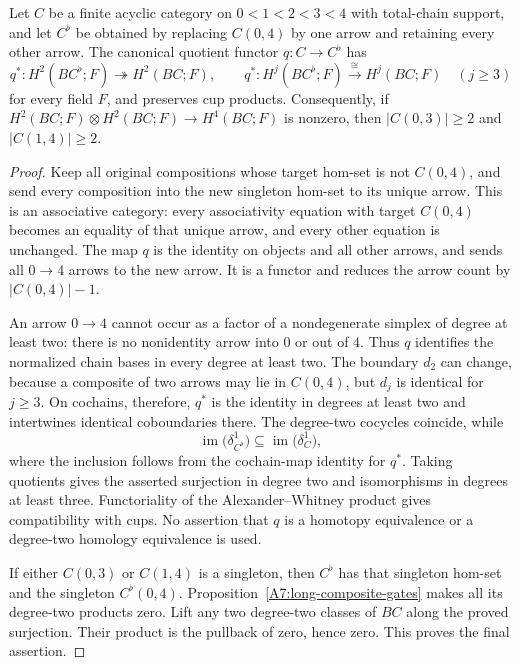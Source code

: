 \begin{proposition}
\label{A7:extreme-arrow-collapse}
Let $C$ be a finite acyclic category on $0<1<2<3<4$ with total-chain
support, and let $C^{\flat}$ be obtained by replacing $C(0,4)$ by
one arrow and retaining every other arrow. The canonical quotient
functor $q:C\to C^{\flat}$ has
\[
 q^*:H^2(BC^{\flat};F)\twoheadrightarrow H^2(BC;F),
 \qquad
 q^*:H^j(BC^{\flat};F)\xrightarrow{\cong}H^j(BC;F)
 \quad(j\geq3)
\]
for every field $F$, and preserves cup products. Consequently, if
$H^2(BC;F)\otimes H^2(BC;F)\to H^4(BC;F)$ is nonzero, then
$|C(0,3)|\geq2$ and $|C(1,4)|\geq2$.
\end{proposition}
\begin{proof}
Keep all original compositions whose target hom-set is not $C(0,4)$,
and send every composition into the new singleton hom-set to its
unique arrow. This is an associative category: every associativity
equation with target $C(0,4)$ becomes an equality of that unique
arrow, and every other equation is unchanged. The map $q$ is the
identity on objects and all other arrows, and sends all $0\to4$
arrows to the new arrow. It is a functor and reduces the arrow count
by $|C(0,4)|-1$.

An arrow $0\to4$ cannot occur as a factor of a nondegenerate
simplex of degree at least two: there is no nonidentity arrow into
$0$ or out of $4$. Thus $q$ identifies the normalized chain bases
in every degree at least two. The boundary $d_2$ can change,
because a composite of two arrows may lie in $C(0,4)$, but
$d_j$ is identical for $j\geq3$. On cochains, therefore, $q^*$
is the identity in degrees at least two and intertwines identical
coboundaries there. The degree-two cocycles coincide, while
\[
 \operatorname{im}\bigl(\delta^1_{C^{\flat}}\bigr)
 \subseteq\operatorname{im}\bigl(\delta^1_C\bigr),
\]
where the inclusion follows from the cochain-map identity for
$q^*$. Taking quotients gives the asserted surjection in degree
two and isomorphisms in degrees at least three. Functoriality
of the Alexander--Whitney product gives compatibility with cups.
No assertion that $q$ is a homotopy equivalence or a degree-two
homology equivalence is used.

If either $C(0,3)$ or $C(1,4)$ is a singleton, then $C^{\flat}$
has that singleton hom-set and the singleton $C^{\flat}(0,4)$.
Proposition~\ref{A7:long-composite-gates} makes all its degree-two
products zero. Lift any two degree-two classes of $BC$ along the
proved surjection. Their product is the pullback of zero, hence
zero. This proves the final assertion.
\end{proof}
